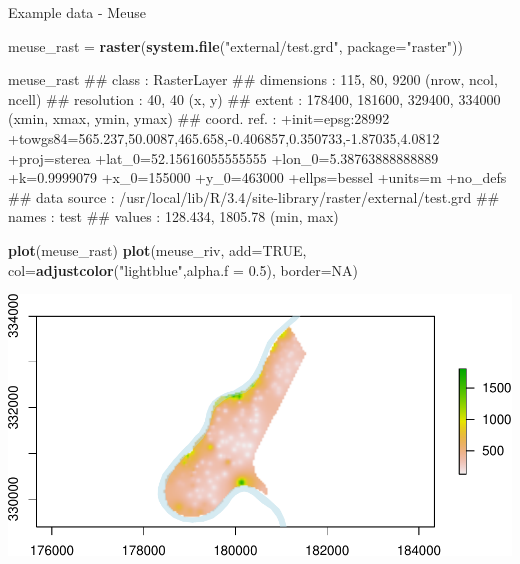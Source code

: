 \documentclass[11pt,ignorenonframetext,]{beamer}
\newenvironment{Shaded}{}{}
\newcommand{\DataTypeTok}[1]{\textcolor[rgb]{0.56,0.13,0.00}{#1}}
\newcommand{\FloatTok}[1]{\textcolor[rgb]{0.25,0.63,0.44}{#1}}
\newcommand{\KeywordTok}[1]{\textcolor[rgb]{0.00,0.44,0.13}{\textbf{#1}}}
\newcommand{\NormalTok}[1]{#1}
\newcommand{\OtherTok}[1]{\textcolor[rgb]{0.00,0.44,0.13}{#1}}
\newcommand{\StringTok}[1]{\textcolor[rgb]{0.25,0.44,0.63}{#1}}
\let\oldShaded\Shaded
\let\endoldShaded\endShaded
\renewenvironment{Shaded}{\footnotesize\begin{spacing}{0.9}\oldShaded}{\endoldShaded\end{spacing}}
\let\oldverbatim\verbatim
\let\endoldverbatim\endverbatim
\newcommand{\scriptoutput}{
  \renewenvironment{Shaded}{\scriptsize\begin{spacing}{0.9}\oldShaded}{\endoldShaded\end{spacing}}
  \renewenvironment{verbatim}{\scriptsize\begin{spacing}{0.9}\oldverbatim}{\endoldverbatim\end{spacing}}
}
\begin{document}
\begin{frame}[fragile,t]{Example data - Meuse}
\protect\hypertarget{example-data---meuse-1}{}

\scriptoutput

\begin{Shaded}
\begin{Highlighting}[]
\NormalTok{meuse_rast =}\StringTok{ }\KeywordTok{raster}\NormalTok{(}\KeywordTok{system.file}\NormalTok{(}\StringTok{"external/test.grd"}\NormalTok{, }\DataTypeTok{package=}\StringTok{"raster"}\NormalTok{))}

\NormalTok{meuse_rast}
\NormalTok{## class       : RasterLayer }
\NormalTok{## dimensions  : 115, 80, 9200  (nrow, ncol, ncell)}
\NormalTok{## resolution  : 40, 40  (x, y)}
\NormalTok{## extent      : 178400, 181600, 329400, 334000  (xmin, xmax, ymin, ymax)}
\NormalTok{## coord. ref. : +init=epsg:28992 +towgs84=565.237,50.0087,465.658,-0.406857,0.350733,-1.87035,4.0812 +proj=sterea +lat_0=52.15616055555555 +lon_0=5.38763888888889 +k=0.9999079 +x_0=155000 +y_0=463000 +ellps=bessel +units=m +no_defs }
\NormalTok{## data source : /usr/local/lib/R/3.4/site-library/raster/external/test.grd }
\NormalTok{## names       : test }
\NormalTok{## values      : 128.434, 1805.78  (min, max)}
\end{Highlighting}
\end{Shaded}

\end{frame}

\begin{frame}[fragile,t]{}
\protect\hypertarget{section-7}{}

\scriptoutput

\begin{Shaded}
\begin{Highlighting}[]
\KeywordTok{plot}\NormalTok{(meuse_rast)}
\KeywordTok{plot}\NormalTok{(meuse_riv, }\DataTypeTok{add=}\OtherTok{TRUE}\NormalTok{, }\DataTypeTok{col=}\KeywordTok{adjustcolor}\NormalTok{(}\StringTok{"lightblue"}\NormalTok{,}\DataTypeTok{alpha.f =} \FloatTok{0.5}\NormalTok{), }\DataTypeTok{border=}\OtherTok{NA}\NormalTok{)}
\end{Highlighting}
\end{Shaded}

\begin{center}\includegraphics[width=\textwidth]{Lec16_files/figure-beamer/unnamed-chunk-41-1} \end{center}

\end{frame}
\end{document}
